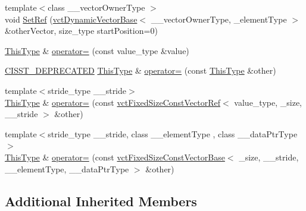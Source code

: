 \begin{DoxyCompactItemize}
\item 
{\footnotesize template$<$class \+\_\+\+\_\+vector\+Owner\+Type $>$ }\\void \hyperlink{classvct_fixed_size_vector_ref_a364a56cef34237c8cf3c82b3f80f2ec3}{Set\+Ref} (\hyperlink{classvct_dynamic_vector_base}{vct\+Dynamic\+Vector\+Base}$<$ \+\_\+\+\_\+vector\+Owner\+Type, \+\_\+element\+Type $>$ \&other\+Vector, size\+\_\+type start\+Position=0)
\item 
\hyperlink{classvct_fixed_size_vector_ref_a3fc8fbdfc7492a38119e7ed7ef5bc289}{This\+Type} \& \hyperlink{classvct_fixed_size_vector_ref_a45f99030a632daf58a5543977ff17aba}{operator=} (const value\+\_\+type \&value)
\end{DoxyCompactItemize}
{\bf }\par
\begin{DoxyCompactItemize}
\item 
\hyperlink{cmn_portability_8h_a63da7164735f9501be651b1f2bbc0121}{C\+I\+S\+S\+T\+\_\+\+D\+E\+P\+R\+E\+C\+A\+T\+E\+D} \hyperlink{classvct_fixed_size_vector_ref_a3fc8fbdfc7492a38119e7ed7ef5bc289}{This\+Type} \& \hyperlink{classvct_fixed_size_vector_ref_ab9ed830103e54fb768ec716a63f2855b}{operator=} (const \hyperlink{classvct_fixed_size_vector_ref_a3fc8fbdfc7492a38119e7ed7ef5bc289}{This\+Type} \&other)
\item 
{\footnotesize template$<$stride\+\_\+type \+\_\+\+\_\+stride$>$ }\\\hyperlink{classvct_fixed_size_vector_ref_a3fc8fbdfc7492a38119e7ed7ef5bc289}{This\+Type} \& \hyperlink{classvct_fixed_size_vector_ref_a221b35a3d4438dce9d039ff271912925}{operator=} (const \hyperlink{classvct_fixed_size_const_vector_ref}{vct\+Fixed\+Size\+Const\+Vector\+Ref}$<$ value\+\_\+type, \+\_\+size, \+\_\+\+\_\+stride $>$ \&other)
\item 
{\footnotesize template$<$stride\+\_\+type \+\_\+\+\_\+stride, class \+\_\+\+\_\+element\+Type , class \+\_\+\+\_\+data\+Ptr\+Type $>$ }\\\hyperlink{classvct_fixed_size_vector_ref_a3fc8fbdfc7492a38119e7ed7ef5bc289}{This\+Type} \& \hyperlink{classvct_fixed_size_vector_ref_a20f94dc48a46c8c16917fd7ef9f1c92c}{operator=} (const \hyperlink{classvct_fixed_size_const_vector_base}{vct\+Fixed\+Size\+Const\+Vector\+Base}$<$ \+\_\+size, \+\_\+\+\_\+stride, \+\_\+\+\_\+element\+Type, \+\_\+\+\_\+data\+Ptr\+Type $>$ \&other)
\end{DoxyCompactItemize}

\subsection*{Additional Inherited Members}


